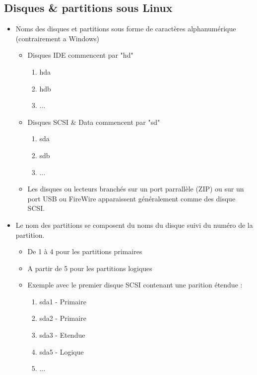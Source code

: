 \documentclass[a4paper]{article}
\begin{document}
    \subsection{Disques \& partitions sous Linux}
    \begin{itemize}[label=\textbullet, font=\Large]
      \item Noms des disques et partitions sous forme de caractères alphanumérique (contrairement a Windows)
      \begin{itemize}[label=, font=\scriptsize]
        \item Disques IDE commencent par "hd"
        \begin{enumerate}
          \item hda 
          \item hdb
          \item ...
        \end{enumerate}
        \item Disques SCSI \& Data commencent par "sd"
        \begin{enumerate}
          \item sda
          \item sdb
          \item ...
        \end{enumerate}
        \item Les disques ou lecteurs branchés sur un port parrallèle (ZIP) ou sur un port USB ou FireWire apparaissent généralement comme des disque SCSI.
      \end{itemize}
      \item Le nom des partitions se composent du noms du disque suivi du numéro de la partition.
      \begin{itemize}[label=, font=\scriptsize]
        \item De 1 à 4 pour les partitions primaires
        \item A partir de 5 pour les partitions logiques
        \item Exemple avec le premier disque SCSI contenant une parition étendue :
      \begin{enumerate}
        \item sda1 - Primaire
        \item sda2 - Primaire
        \item sda3 - Etendue
        \item sda5 - Logique
        \item ...
      \end{enumerate}
    \end{itemize}
    \end{itemize}
\end{document}

